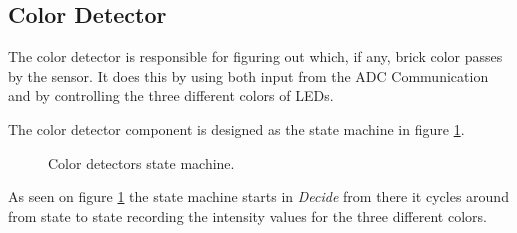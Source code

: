 
\subsection{Color Detector}
The color detector is responsible for figuring out which, if any, brick color passes by the sensor.
It does this by using both input from the ADC Communication and by controlling the three different colors of LEDs.

The color detector component is designed as the state machine in figure \ref{fig:colordetector_fsm}.



\begin{figure}[H]
\centering
{}

\caption{Color detectors state machine.}
\label{fig:colordetector_fsm}
\end{figure}

As seen on figure \ref{fig:colordetector_fsm} the state machine starts in \textit{Decide} from there it cycles around from state to state recording the intensity values for the three different colors.

